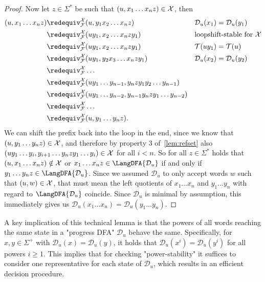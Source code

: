 \documentclass[a4paper,USenglish,cleveref,autoref,thm-restate]{lipics-v2021}
\newcommand{\mc}[1]{\ensuremath{\mathcal{#1}}}
\newcommand{\T}{\mc{T}}
\newcommand{\F}{\mc{F}}
\newcommand{\D}{\mc{D}}
\begin{document}
{\begin{proof}
  Now let $z \in \Sigma^*$ be such that $(u,x_1\dots x_nz) \in \mathcal{X}$, then
  \begin{align*}
  (u, x_1\dots x_nz) & \redequiv^\X_\F (u,y_1x_2\dots x_nz) & & \D_u(x_1) = \D_u(y_1)\\
  & \redequiv^\X_\F (uy_1,x_2\dots x_nzy_1) && \text{loopshift-stable for $\X$}\\
  & \redequiv^\X_\F (uy_1,x_2\dots x_nzy_1) && \T(uy_1) = \T(u)\\
  & \redequiv^\X_\F (uy_1, y_2x_3\dots x_nzy_1) && \D_u(x_2) = \D_u(y_2)\\
 & \redequiv^\X_\F \dots \\
 & \redequiv^\X_\F (uy_1\dots y_{n-1}, y_nzy_1y_2\dots y_{n-1})\\
 & \redequiv^\X_\F (uy_1\dots y_{n-2}, y_{n-1}y_nzy_1\dots y_{n-2}) \\
 & \redequiv^\X_\F \dots \\
 & \redequiv^\X_\F (u, y_1\dots y_n z).
  \end{align*}
  We can shift the prefix back into the loop in the end, since we know that $(u,y_1\dots y_nz) \in \mathcal{X}$, and therefore by property 3 of~\cref{lem:refset} also $(uy_1\dots y_i,y_{i+1}\dots y_nzy_1\dots y_i) \in \mathcal{X}$ for all $i < n$.
  So for all $z \in \Sigma^*$ holds that $(u,x_1\dots x_nz) \notin \mathcal{X}$ or $x_1\dots x_nz \in \LangDFA{\D_u}$ if and only if $y_1\dots y_nz \in \LangDFA{\D_u}$.
  Since we assumed $\D_u$ to only accept words $w$ such that $(u,w) \in \mathcal{X}$, that must mean the left quotients of $x_1\dots x_n$ and $y_1\dots y_n$ with regard to $\LangDFA{\D_u}$ coincide.
  Since $\D_u$ is minimal by assumption, this immediately gives us $\D_u(x_1\dots x_n) = \D_u(y_1\dots y_n)$.
\end{proof}

A key implication of this technical lemma is that the powers of all words reaching the same state in a "progress DFA" $\D_u$ behave the same.
Specifically, for $x, y \in \Sigma^+$ with $\D_u(x) = \D_u(y)$, it holds that $\D_u(x^i) = \D_u(y^i)$ for all powers $i \geq 1$.
This implies that for checking "power-stability" it suffices to consider one representative for each state of $\D_u$, which results in an efficient decision procedure.

}
\end{document}

